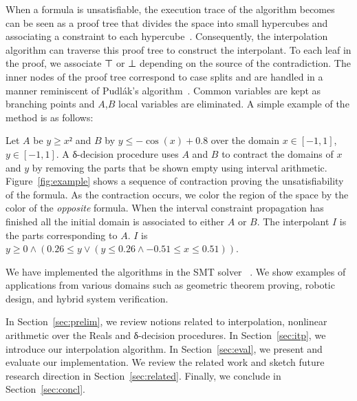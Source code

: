 When a formula is unsatisfiable, the execution trace of the algorithm becomes can be seen as a proof tree that divides the space into small hypercubes and associating a constraint to each hypercube~\cite{DBLP:conf/synasc/GaoKC14}. Consequently, the interpolation algorithm can traverse this proof tree to construct the interpolant. To each leaf in the proof, we associate ⊤ or ⊥ depending on the source of the contradiction. The inner nodes of the proof tree correspond to case splits and are handled in a manner reminiscent of Pudl{\'a}k's algorithm~\cite{MR1472134}. Common variables are kept as branching points and $A$,$B$ local variables are eliminated. A simple example of the method is as follows:

\begin{example}
Let $A$ be $y≥x²$ and $B$ by $y ≤ -\cos(x) + 0.8$ over the domain $x∈[-1,1]$, $y∈[-1,1]$.
A δ-decision procedure uses $A$ and $B$ to contract the domains of $x$ and $y$ by removing the parts that be shown empty using interval arithmetic.
Figure~\ref{fig:example} shows a sequence of contraction proving the unsatisfiability of the formula.
As the contraction occurs, we color the region of the space by the color of the \emph{opposite} formula.
When the interval constraint propagation has finished all the initial domain is associated to either $A$ or $B$.
The interpolant $I$ is the parts corresponding to $A$.
$I$ is $y ≥ 0 ∧ (0.26 ≤ y ∨ (y ≤ 0.26 ∧ -0.51 ≤ x ≤ 0.51))$.
\end{example}

We have implemented the algorithms in the SMT solver \dReal~\cite{DBLP:conf/cade/GaoKC13}. We show examples of applications from various domains such as geometric theorem proving, robotic design, and hybrid system verification.  

In Section~\ref{sec:prelim}, we review notions related to interpolation, nonlinear arithmetic over the Reals and δ-decision procedures.
In Section~\ref{sec:itp}, we introduce our interpolation algorithm.
In Section~\ref{sec:eval}, we present and evaluate our implementation.
We review the related work and sketch future research direction in Section~\ref{sec:related}.
Finally, we conclude in Section~\ref{sec:concl}.



